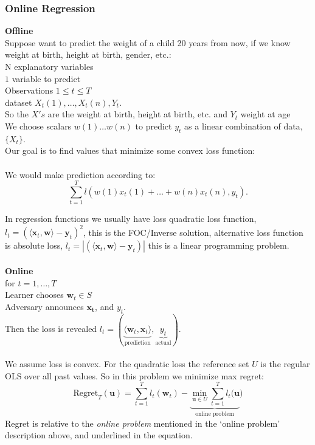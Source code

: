 \documentclass[11pt]{article}
\newcommand\tab[1][1cm]{\hspace*{#1}}
\theoremstyle{quest}
\begin{document}
\subsubsection{Online Regression}
\textbf{Offline}\\
Suppose want to predict the weight of a child 20 years from now, if we know  weight at birth, height at birth, gender, etc.:
\\
\tab N explanatory variables\\
\tab $1$ variable to predict\\
\tab Observations $1\le t \le T$ \\ 
\tab dataset $X_t(1), \dots, X_t(n), Y_t$.\\
\tab \tab So the $X's$ are the weight at birth, height at birth, etc. and $Y_t$ weight at age\\
\tab We choose scalars $w(1)\dots w(n)$ to predict $y_t$ as a linear combination of data, $\{X_t\}$.\\
\tab Our goal is to find values that minimize some convex loss function:\\ \\ 
We would make prediction according to:\\
\[\sum_{t=1}^T l(w(1)x_t(1)+\dots+w(n)x_t(n), y_t).\] 

In regression functions we usually have loss quadratic loss function, $l_t=(\langle \mathbf{x}_t, \mathbf{w} \rangle -\mathbf{y}_t)^2$, this is the FOC/Inverse solution, alternative loss function is absolute loss, $l_t=|(\langle \mathbf{x}_t, \mathbf{w} \rangle -\mathbf{y}_t)|$  this is a linear programming problem. \\ \\
\textbf{Online}\\
for $t=1,\dots, T$ \\ 
\tab Learner chooses $\mathbf{w}_t\in S$\\
\tab Adversary announces $\mathbf{x_t}$, and $y_t$. \\
\tab Then the loss is revealed $l_t=(\underbrace{\langle \mathbf{w}_t, \mathbf{x}_t \rangle}_\text{prediction} , \underbrace{y_t}_\text{actual})$. \\ \\ 
We assume loss is convex. For the quadratic loss the reference set $U$ is the regular OLS over all past values. So in this problem we minimize max regret:
$$\text{Regret}_T(\mathbf{u})= \sum_{t=1}^T l_t(\mathbf{w}_t) - \underbrace{\min_{\mathbf{u}\in U}\sum_{t=1}^T  l_t(\mathbf{u}}_{\text{online problem}})$$ 
Regret is relative to the \textit{online problem} mentioned in the `online problem' description above, and underlined in the equation. 
\end{document}
